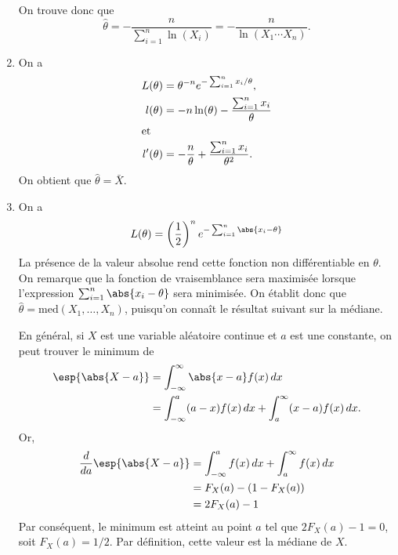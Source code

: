 \begin{exercice}
\begin{sol}
\begin{enumerate}
      On trouve donc que
      \begin{equation*}
      \hat{\theta} = -\frac{n}{\sum_{i=1}^n \ln(X_i)} =
      -\frac{n}{\ln(X_1 \cdots X_n)}.
      \end{equation*}
    \item  On a
      \begin{align*}
        L(\theta) &= \theta^{-n} e^{-\sum_{i=1}^n x_i/\theta}, \\
        l(\theta) &= -n \ln(\theta) - \frac{\sum_{i=1}^n x_i}{\theta} \\
        \intertext{et}
        l^\prime(\theta) &= -\frac{n}{\theta} +
        \frac{\sum_{i=1}^n x_i}{\theta^2}.
      \end{align*}
      On obtient que $\hat{\theta} = \bar{X}$.
    \item On a
      \begin{equation*}
        L(\theta) = \left( \frac{1}{2} \right)^n
        e^{-\sum_{i = 1}^n \abs{x_i - \theta}}
      \end{equation*}
      La présence de la valeur absolue rend cette fonction non
      différentiable en $\theta$. On remarque que la fonction de
      vraisemblance sera maximisée lorsque l'expression $\sum_{i=1}^n
      \abs{x_i - \theta}$ sera minimisée. On établit donc que $\hat{\theta} = \text{med}(X_1, \dots, X_n)$, puisqu'on connaît le résultat suivant sur la médiane.
      
      En général, si $X$ est une variable aléatoire continue et $a$ est une constante, on peut trouver le minimum de
    \begin{align*}
      \esp{\abs{X - a}}
      &= \int_{-\infty}^\infty \abs{x - a} f(x)\,dx \\
      &= \int_{-\infty}^a (a - x)f(x)\, dx
      + \int_a^\infty (x - a)f(x)\,dx.
    \end{align*}
    Or,
    \begin{align*}
      \frac{d}{da} \esp{\abs{X - a}}
      &= \int_{-\infty}^a f(x)\, dx + \int_a^\infty f(x)\, dx \\
      &= F_X(a) - (1 - F_X(a)) \\
      &= 2F_X(a) - 1
    \end{align*}
    Par conséquent, le minimum est atteint au point $a$ tel que
    $2F_X(a) - 1 = 0$, soit $F_X(a) = 1/2$. Par définition, cette
    valeur est la médiane de $X$.


\end{enumerate}
\end{sol}
\end{exercice}
